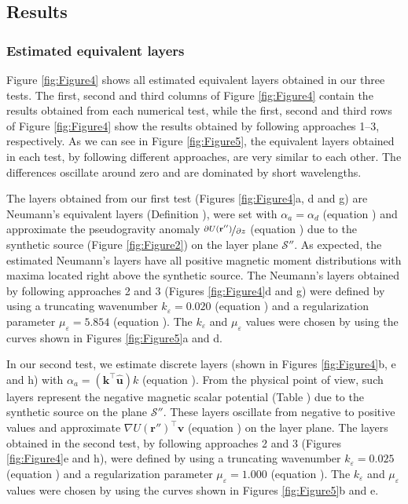 \subsection{Results}

\subsubsection{Estimated equivalent layers}

Figure \ref{fig:Figure4} shows all estimated equivalent layers obtained in our three tests.
The first, second and third columns of Figure \ref{fig:Figure4} contain the results obtained from 
each numerical test, while the first, second and third rows of Figure \ref{fig:Figure4} show the 
results obtained by following approaches 1--3, respectively.
As we can see in Figure \ref{fig:Figure5}, the equivalent layers obtained in each test, by following 
different approaches, are very similar to each other.
The differences oscillate around zero and are dominated by short wavelengths.

The layers obtained from our first test (Figures \ref{fig:Figure4}a, d and g) are Neumann's 
equivalent layers (Definition ), 
were set with $\alpha_{a} = \alpha_{d}$ (equation ) and approximate the
pseudogravity anomaly $\nicefrac{\partial U(\mathbf{r}'')}{\partial z}$ 
(equation ) 
due to the synthetic source (Figure \ref{fig:Figure2}) on the layer plane $\mathcal{S}''$.
As expected, the estimated Neumann's layers have all positive magnetic moment distributions 
with maxima located right above the synthetic source.
The Neumann's layers obtained by following approaches 2 and 3 
(Figures \ref{fig:Figure4}d and g) were defined by using a truncating wavenumber 
$k_{\varepsilon} = 0.020$ (equation )
and a regularization parameter $\mu_{\varepsilon} = 5.854$ 
(equation ). 
The $k_{\varepsilon}$ and $\mu_{\varepsilon}$ values were chosen by using the curves shown 
in Figures \ref{fig:Figure5}a and d.

In our second test, we estimate discrete layers (shown in Figures \ref{fig:Figure4}b, e and h) 
with $\alpha_{a} = \left(\mathbf{k}^{\top} \hat{\mathbf{u}} \right) k$ 
(equation ).
From the physical point of view, such layers represent the negative magnetic scalar 
potential (Table ) due to the synthetic source on the plane $\mathcal{S}''$.
These layers oscillate from negative to positive values and approximate 
$\nabla U(\mathbf{r}'')^{\top} \hat{\mathbf{v}}$ 
(equation ) on the layer plane. 
The layers obtained in the second test, by following approaches 2 and 3 
(Figures \ref{fig:Figure4}e and h), were defined by using a truncating wavenumber 
$k_{\varepsilon} = 0.025$ (equation )
and a regularization parameter $\mu_{\varepsilon} = 1.000$ 
(equation ). 
The $k_{\varepsilon}$ and $\mu_{\varepsilon}$ values were chosen by using the curves shown 
in Figures \ref{fig:Figure5}b and e.

